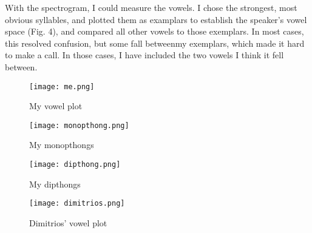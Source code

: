 \documentclass[doc,12pt]{apa6}
\begin{document}
With the spectrogram, I could measure the vowels. I chose the strongest, most
obvious syllables, and plotted them as examplars to establish the speaker's
vowel space (Fig. 4), and compared all other vowels to those exemplars. In most
cases, this resolved confusion, but some fall betweenmy exemplars, which made
it hard to make a call. In those cases, I have included the two vowels I think
it fell between.

\begin{exe}
	\ex {}
\end{exe}

\begin{figure}
	\texttt{[image: me.png]}
	\caption{My vowel plot}
\end{figure}

\begin{figure}
	\texttt{[image: monopthong.png]}
	\caption{My monopthongs}
\end{figure}

\begin{figure}
	\texttt{[image: dipthong.png]}
	\caption{My dipthongs}
\end{figure}

\begin{figure}
	\texttt{[image: dimitrios.png]}
	\caption{Dimitrios' vowel plot}
\end{figure}
\end{document}
